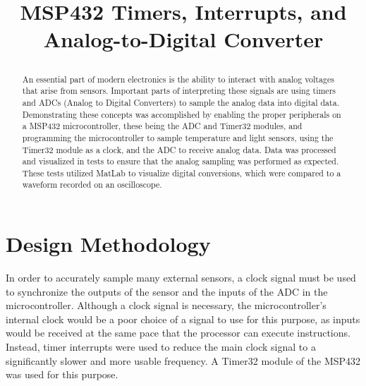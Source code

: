 \documentclass[conference]{IEEEtran}
\begin{document}
\title{MSP432 Timers, Interrupts, and Analog-to-Digital Converter\\

\author{
\and
{}
}
}

\maketitle

\begin{abstract}
An essential part of modern electronics is the ability to interact with
analog voltages that arise from sensors. Important parts of interpreting
these signals are using timers and ADCs (Analog to Digital Converters) to
sample the analog data into digital data. Demonstrating these concepts was
accomplished by enabling the proper peripherals on a MSP432 microcontroller,
these being the ADC and Timer32 modules, and programming the microcontroller
to sample temperature and light sensors, using the Timer32 module
as a clock, and the ADC to receive analog data. Data was processed and
visualized in tests to ensure that the analog sampling was performed as
expected. These tests utilized MatLab to visualize digital conversions,
which were compared to a waveform recorded on an oscilloscope.
\end{abstract}

\section{Design Methodology}
In order to accurately sample many external sensors, a clock signal must be 
used to synchronize the outputs of the sensor and the inputs of the ADC in
the microcontroller. Although a clock signal is necessary, the
microcontroller's internal clock would be a poor choice of a signal to use
for this purpose, as inputs would be received at the same pace that the
processor can execute instructions. Instead, timer interrupts were used to
reduce the main clock signal to a significantly slower and more usable
frequency. A Timer32 module of the MSP432 was used for this purpose.
\end{document}

